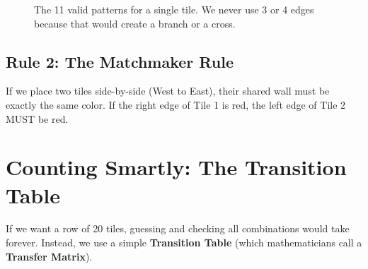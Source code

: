 \documentclass[12pt]{article}
\begin{document}
\begin{figure}[H]
    \centering
    \caption{The 11 valid patterns for a single tile. We never use 3 or 4 edges because that would create a branch or a cross.}
\end{figure}

\subsection*{Rule 2: The Matchmaker Rule}
If we place two tiles side-by-side (West to East), their shared wall must be exactly the same color. If the right edge of Tile 1 is red, the left edge of Tile 2 MUST be red. 

\section{Counting Smartly: The Transition Table}
If we want a row of 20 tiles, guessing and checking all combinations would take forever. Instead, we use a simple \textbf{Transition Table} (which mathematicians call a \textbf{Transfer Matrix}). 
\end{document}
